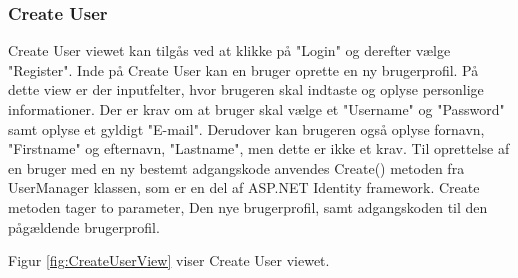 \subsubsection{Create User}

Create User viewet kan tilgås ved at klikke på "Login" og derefter vælge "Register". Inde på Create User kan en bruger oprette en ny brugerprofil. På dette view er der inputfelter, hvor brugeren skal indtaste og oplyse personlige informationer. Der er krav om at bruger skal vælge et "Username" og "Password" samt oplyse et gyldigt "E-mail". Derudover kan brugeren også oplyse fornavn, "Firstname" og efternavn, "Lastname", men dette er ikke et krav. 
Til oprettelse af en bruger med en ny bestemt adgangskode anvendes Create() metoden fra UserManager klassen, som er en del af ASP.NET Identity framework. Create metoden tager to parameter, Den nye brugerprofil, samt adgangskoden til den pågældende brugerprofil. 

Figur \ref{fig:CreateUserView} viser Create User viewet. 

